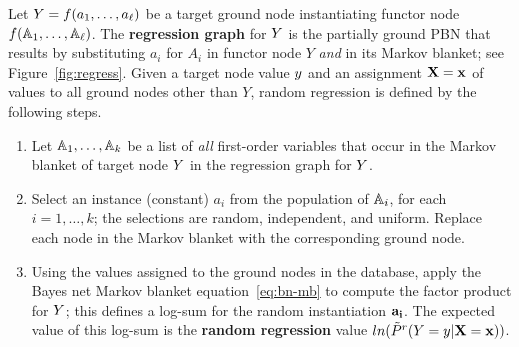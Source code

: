 \documentclass[twoside,leqno,twocolumn]{article}
\begin{document}
Let $Y = f(a_{1},\ldots,a_{\ell})$ be a target ground node instantiating functor node $f(\mathbb{A}_{1},\ldots,\mathbb{A}_{\ell})$.
The \textbf{regression graph} for $Y$ is the partially ground PBN %
that results by substituting $a_{i}$ for $A_{i}$ in functor node $Y$ {\em and} in its Markov blanket; see Figure~\ref{fig:regress}.
Given a target node value $y$ and an assignment $\mathbf{X} = \mathbf{x}$ of values to all ground nodes other than $Y$, random regression is defined by the following steps.

\begin{enumerate}
\item Let $\mathbb{A}_{1},\ldots,\mathbb{A}_{k}$ be a list of {\em all} first-order variables that occur in the Markov blanket of target node $Y$ in the regression graph for $Y$.
\item Select an instance (constant) $a_{i}$ from the population of $\mathbb{A}_{i}$, for each $i=1,\ldots,k$; the selections are random, independent, and uniform. Replace each node in the Markov blanket with the corresponding ground node.
\item Using the values assigned to the ground nodes in the database, apply the Bayes net Markov blanket equation~\eqref{eq:bn-mb} 
to compute the factor product for $Y$; this defines a log-sum for the random instantiation $\mathbf{a_{i}}$. The expected value of this log-sum is the \textbf{random regression} value $ln(\tilde{P}^{r}(Y = y|\mathbf{X}=\mathbf{x}))$. 
\end{enumerate}
\end{document}

